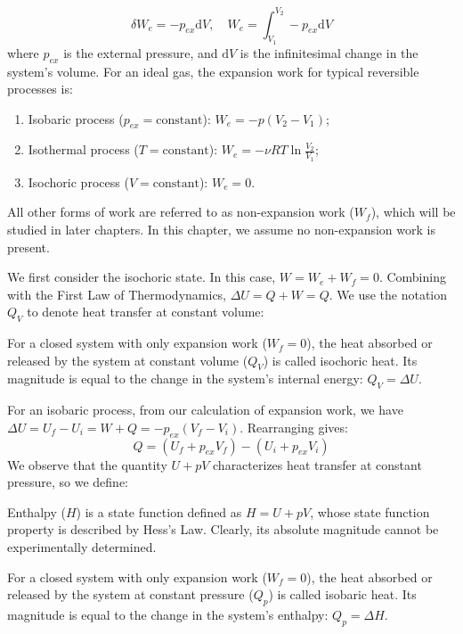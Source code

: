 \begin{proposition}
$$\delta W_e = -p_{ex}\mathrm{d}V, \quad W_e = \int_{V_1}^{V_2} -p_{ex}\mathrm{d}V$$
where $p_{ex}$ is the external pressure, and $\mathrm{d}V$ is the infinitesimal change in the system's volume. For an ideal gas, the expansion work for typical reversible processes is:
\begin{enumerate}
    \item Isobaric process ($p_{ex}=\text{constant}$): $W_e = -p(V_2 - V_1)$;
    \item Isothermal process ($T=\text{constant}$): $W_e = - \nu RT\ln\frac{V_2}{V_1}$;
    \item Isochoric process ($V=\text{constant}$): $W_e = 0$.
\end{enumerate}
\end{proposition}

All other forms of work are referred to as non-expansion work ($W_f$), which will be studied in later chapters. In this chapter, we assume no non-expansion work is present.

We first consider the isochoric state. In this case, $W = W_e + W_f = 0$. Combining with the First Law of Thermodynamics, $\Delta U = Q + W = Q$. We use the notation $Q_V$ to denote heat transfer at constant volume:

\begin{definition}
For a closed system with only expansion work ($W_f=0$), the heat absorbed or released by the system at constant volume ($Q_V$) is called isochoric heat. Its magnitude is equal to the change in the system's internal energy: $Q_V = \Delta U$.
\end{definition}

For an isobaric process, from our calculation of expansion work, we have $\Delta U = U_f - U_i = W + Q = - p_{ex} (V_f - V_i )$. Rearranging gives:
$$Q =(U_f + p_{ex} V_f ) - (U_i + p_{ex} V_i)$$
We observe that the quantity $U + pV$ characterizes heat transfer at constant pressure, so we define:

\begin{definition}
Enthalpy ($H$) is a state function defined as $H = U + pV$, whose state function property is described by Hess's Law. Clearly, its absolute magnitude cannot be experimentally determined.

For a closed system with only expansion work ($W_f=0$), the heat absorbed or released by the system at constant pressure ($Q_p$) is called isobaric heat. Its magnitude is equal to the change in the system's enthalpy: $Q_p = \Delta H$.
\end{definition}

